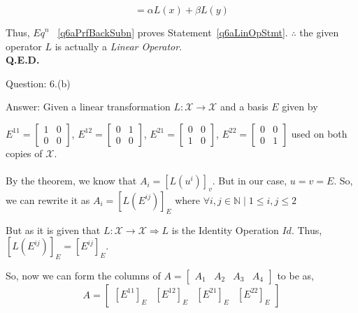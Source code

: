 \documentclass[a4paper]{article}
\begin{document}
\begin{qalist}
		\begin{equation}\label{q6aPrfBackSubn}
			= \alpha L(x) + \beta L(y)
		\end{equation}
		
		Thus, ${Eq}^{n}$ ~\ref{q6aPrfBackSubn} proves Statement~\ref{q6aLinOpStmt}. $\therefore$ the given operator $L$ is actually a \textit{Linear Operator}. \\ \textbf{Q.E.D.}
		
		\item[Question: 6.(b)] \setcounter{equation}{0} 
		\item[Answer:] Given a linear transformation $L : \mathcal{X} \rightarrow \mathcal{X}$ and a basis $E$ given by 
		
		${E}^{11} = \begin{bmatrix}1 & 0 \\ 0 & 0 \end{bmatrix}$, ${E}^{12} = \begin{bmatrix}0 & 1 \\ 0 & 0 \end{bmatrix}$, ${E}^{21} = \begin{bmatrix}0 & 0 \\ 1 & 0 \end{bmatrix}$, ${E}^{22} = \begin{bmatrix}0 & 0 \\ 0 & 1 \end{bmatrix}$ used on both copies of $\mathcal{X}$.
%		
		\\ \\ By the theorem, we know that ${A}_{i} = {[L({u}^{i})]}_{v}$. But in our case, $u = v = E$. So, we can rewrite it as ${A}_{i} = {[L({E}^{ij})]}_{E}$ where $\forall i,j\in \mathbb{N} \; | \; 1 \leq i,j \leq 2$
		
		But as it is given that $L : \mathcal{X} \rightarrow \mathcal{X} \Rightarrow L$ is the Identity Operation $Id$. Thus, ${[L({E}^{ij})]}_{E} = {[{E}^{ij}]}_{E}$.
		
		So, now we can form the columns of $A = \begin{bmatrix} {A}_{1} & {A}_{2} & {A}_{3} & {A}_{4}\end{bmatrix}$ to be as, 
		\begin{equation}\label{q6bMatRepnForm}
			A = \begin{bmatrix} {[{E}^{11}]}_{E} & {[{E}^{12}]}_{E} & {[{E}^{21}]}_{E} & {[{E}^{22}]}_{E}\end{bmatrix}
		\end{equation}
		

\end{qalist}
\end{document}
